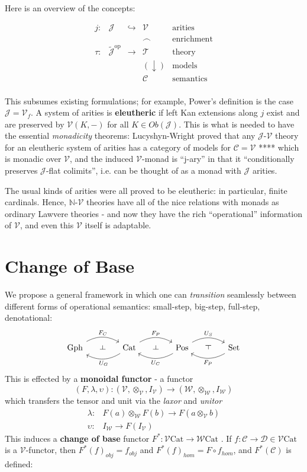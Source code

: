 \documentclass[a4paper,UKenglish]{article}
\theoremstyle{definition}
\def\rd{\rotatebox[origin=c]{90}{$\dashv$}} %
\def\ld{\rotatebox[origin=c]{-90}{$\dashv$}} %
\newcommand{\Gph}{\mathrm{Gph}}
\newcommand{\Set}{\mathrm{Set}}
\newcommand{\Cat}{\mathrm{Cat}}
\newcommand{\Pos}{\mathrm{Pos}}
\newcommand{\op}{\mathrm{op}}
\newcommand{\NN}{\mathbb{N}}
\newcommand{\V}{\mathscr{V}}
\newcommand{\W}{\mathscr{W}}
\newcommand{\C}{\mathscr{C}}
\newcommand{\D}{\mathscr{D}}
\newcommand{\T}{\mathscr{T}}
\newcommand{\J}{\mathscr{J}}
\begin{document}
Here is an overview of the concepts: 

\[\begin{array}{ccccl}
j: & \J & \hookrightarrow & \V & \text{arities}\\
& & & \frown & \text{enrichment}\\
\tau: & \tilde{\J}^\op & \to & \T & \text{theory}\\
& & & (\downarrow) & \text{models}\\
& & & \C & \text{semantics}\\
\end{array}\]

This subsumes existing formulations; for example, Power's definition is the case $\J = \V_f$. A system of arities is \textbf{eleutheric} if left Kan extensions along $j$ exist and are preserved by $\V(K,-)$ for all $K \in Ob(\J)$. This is what is needed to have the essential \textit{monadicity} theorems: Lucyshyn-Wright proved that any $\J$-$\V$ theory for an eleutheric system of arities has a category of models for $\C = \V$ **** which is monadic over $\V$, and the induced $\V$-monad is ``j-ary'' in that it ``conditionally preserves $\J$-flat colimits'', i.e. can be thought of as a monad with $\J$ arities.

The usual kinds of arities were all proved to be eleutheric: in particular, finite cardinals. Hence, $\NN$-$\V$ theories have all of the nice relations with monads as ordinary Lawvere theories - and now they have the rich ``operational'' information of $\V$, and even this $\V$ itself is adaptable.

\section{Change of Base}

We propose a general framework in which one can \textit{transition} seamlessly between different forms of operational semantics: small-step, big-step, full-step, denotational:
\[
\begin{tikzcd}[column sep=small]
\Gph \arrow[bend left,below]{rr}{F_C}
& \ld &
\arrow[bend left,above]{ll}{U_G} \Cat \arrow[bend left,below]{rr}{F_P}
& \ld &
\arrow[bend left,above]{ll}{U_C} \Pos \arrow[bend left,below]{rr}{U_S}
& \rd &
\Set \arrow[bend left,above]{ll}{F_P}
\end{tikzcd}
\]
This is effected by a \textbf{monoidal functor} - a functor $$(F,\lambda,\upsilon): (\V,\otimes_\V,I_\V) \to (\W,\otimes_\W,I_\W)$$ which transfers the tensor and unit via the \textit{laxor} and \textit{unitor}
\[\begin{array}{rl}
\lambda: & F(a) \otimes_\W F(b) \to F(a\otimes_\V b)\\
\upsilon: & I_\W \to F(I_\V)
\end{array}\]
This induces a \textbf{change of base} functor $F^*:\V\Cat \to \W\Cat$ \cite{borceux}. If $f: \C \to \D \in \V\Cat$ is a $\V$-functor, then $F^*(f)_{obj} = f_{obj}$ and $F^*(f)_{hom} = F\circ f_{hom}$, and $F^*(\C)$ is defined:
\end{document}
